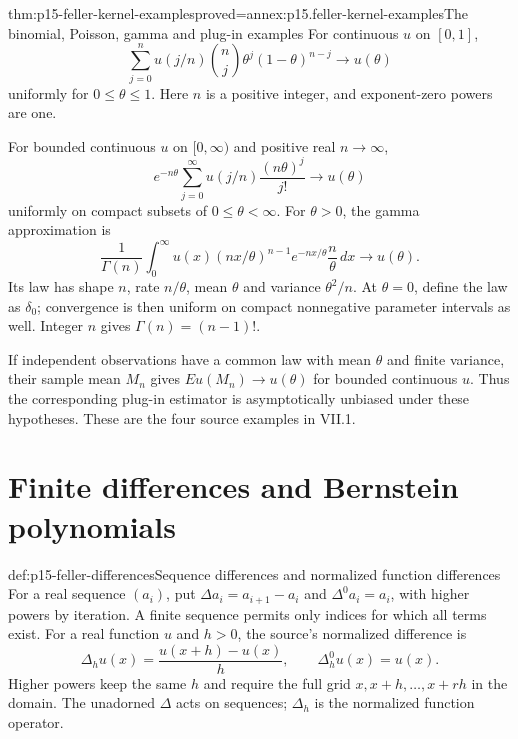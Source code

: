 \begin{hbtheorem}{thm:p15-feller-kernel-examples}{proved=annex:p15.feller-kernel-examples}{The binomial, Poisson, gamma and plug-in examples}
For continuous \(u\) on \([0,1]\),
\[
 \sum_{j=0}^n u(j/n)\binom nj\theta^j(1-\theta)^{n-j}
                         \longrightarrow u(\theta)
\]
uniformly for \(0\leq\theta\leq1\).
Here \(n\) is a positive integer, and exponent-zero powers are one.

For bounded continuous \(u\) on \([0,\infty)\) and positive real
\(n\to\infty\),
\[
 e^{-n\theta}\sum_{j=0}^\infty u(j/n)\frac{(n\theta)^j}{j!}
                         \longrightarrow u(\theta)
\]
uniformly on compact subsets of \(0\leq\theta<\infty\).
For \(\theta>0\), the gamma approximation is
\[
 \frac1{\Gamma(n)}\int_0^\infty
       u(x)(nx/\theta)^{n-1}e^{-nx/\theta}\frac n\theta\,dx
                         \longrightarrow u(\theta).
\]
Its law has shape \(n\), rate \(n/\theta\), mean \(\theta\)
and variance \(\theta^2/n\). At \(\theta=0\), define the law as
\(\delta_0\); convergence is then uniform on compact nonnegative
parameter intervals as well. Integer \(n\) gives \(\Gamma(n)=(n-1)!\).

If independent observations have a common law with mean \(\theta\) and
finite variance, their sample mean \(M_n\) gives
\(E u(M_n)\to u(\theta)\) for bounded continuous \(u\).
Thus the corresponding plug-in estimator is asymptotically unbiased
under these hypotheses. These are the four source examples in VII.1.
\end{hbtheorem}

\section{Finite differences and Bernstein polynomials}

\begin{hbdefinition}{def:p15-feller-differences}{Sequence differences and normalized function differences}
For a real sequence \((a_i)\), put
\(\Delta a_i=a_{i+1}-a_i\) and
\(\Delta^0a_i=a_i\), with higher powers by iteration.
A finite sequence permits only indices for which all terms exist.
For a real function \(u\) and \(h>0\), the source's normalized
difference is
\[
                 \Delta_h u(x)=\frac{u(x+h)-u(x)}h,
                 \qquad \Delta_h^0u(x)=u(x).
\]
Higher powers keep the same \(h\) and require the full grid
\(x,x+h,\ldots,x+rh\) in the domain.
The unadorned \(\Delta\) acts on sequences; \(\Delta_h\) is the
normalized function operator.
\end{hbdefinition}

